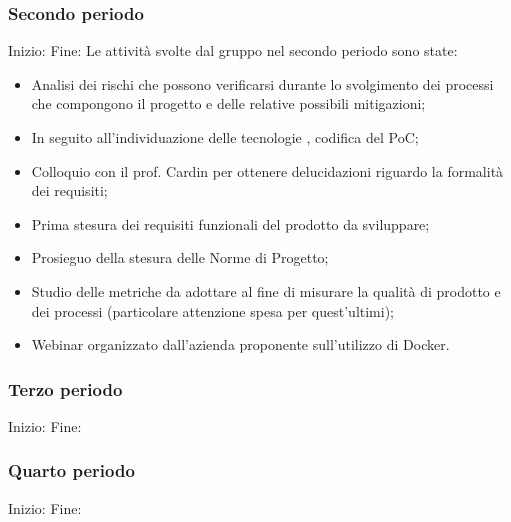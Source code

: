 \subsubsection{Secondo periodo}
Inizio: \hline
Fine: \hline
{}
Le attività svolte dal gruppo nel secondo periodo sono state:
\begin{itemize}
    \item Analisi dei rischi che possono verificarsi durante lo svolgimento dei processi 
    che compongono il progetto e delle relative possibili mitigazioni;
    \item In seguito all'individuazione delle tecnologie , codifica del PoC;
    \item Colloquio con il prof. Cardin per ottenere delucidazioni riguardo la formalità dei requisiti;
    \item Prima stesura dei requisiti funzionali del prodotto da sviluppare;
    \item Prosieguo della stesura delle Norme di Progetto;
    \item Studio delle metriche da adottare al fine di misurare la qualità di prodotto e dei processi (particolare attenzione
    spesa per quest'ultimi);
    \item Webinar organizzato dall'azienda proponente sull'utilizzo di Docker.
\end{itemize}
\subsubsection{Terzo periodo}
Inizio: \hline
Fine: \hline
{}
\subsubsection{Quarto periodo}
Inizio: \hline
Fine: \hline
{}
